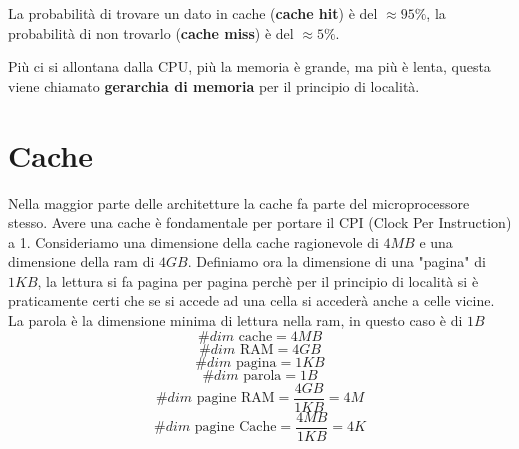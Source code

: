 \documentclass[a4paper]{article}
\theoremstyle{break}
\theoremstyle{break}
\theoremstyle{break}
\theoremstyle{break}
\begin{document}
\noindent La probabilità di trovare un dato in cache (\textbf{cache hit}) è del \( \approx 95\% \),
la probabilità di non trovarlo (\textbf{cache miss}) è del \( \approx 5\% \).

\vspace{1em}
\noindent Più ci si allontana dalla CPU, più la memoria è grande, ma più è lenta, questa
viene chiamato \textbf{gerarchia di memoria} per il principio di località.

\section{Cache}
Nella maggior parte delle architetture la cache fa parte del microprocessore stesso.
Avere una cache è fondamentale per portare il CPI (Clock Per Instruction) a 1.
Consideriamo una dimensione della cache ragionevole di \( 4MB \) e una dimensione
della ram di \( 4GB \). Definiamo ora la dimensione di una "pagina" di \( 1KB \), la
lettura si fa pagina per pagina perchè per il principio di località si è praticamente
certi che se si accede ad una cella si accederà anche a celle vicine. La parola è
la dimensione minima di lettura nella ram, in questo caso è di \( 1B \) 
\[
\#dim \text{ cache} = 4MB
\] 
\[
\#dim \text{ RAM} = 4GB
\] 
\[
\#dim \text{ pagina} = 1KB
\] 
\[
\#dim \text{ parola} = 1B
\] 
\[
\#dim \text{ pagine RAM} = \frac{4GB}{1KB} = 4M
\] 
\[
\#dim \text{ pagine Cache} = \frac{4MB}{1KB} = 4K
\] 

\begin{figure}[H]
  \centering
\end{figure}
\end{document}
